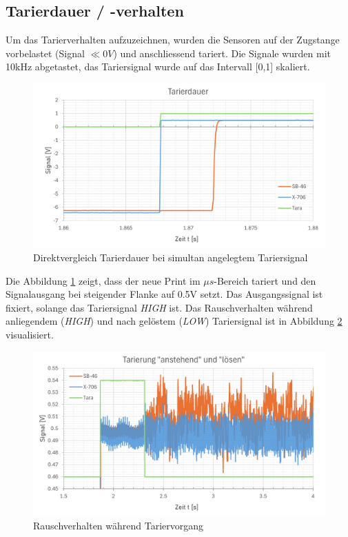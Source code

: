 \documentclass[12pt,a4paper]{article}
\begin{document}
	\subsection{Tarierdauer / -verhalten}
	Um das Tarierverhalten aufzuzeichnen, wurden die Sensoren auf der Zugstange vorbelastet (Signal $\ll 0V$) und anschliessend tariert. Die Signale wurden mit 10kHz abgetastet, das Tariersignal wurde auf das Intervall [0,1] skaliert.
	\begin{figure}[H]
		\centering
		\includegraphics[width=1\linewidth]{Imgs/Tarierdauer}
		\caption{Direktvergleich Tarierdauer bei simultan angelegtem Tariersignal}
		\label{fig:tarierdauer}
	\end{figure}\noindent
	Die Abbildung \ref{fig:tarierdauer} zeigt, dass der neue Print im  $\mu s$-Bereich tariert und den Signalausgang bei steigender Flanke auf 0.5V setzt. Das Ausgangssignal ist fixiert, solange das Tariersignal \textit{HIGH} ist. Das Rauschverhalten während anliegendem (\textit{HIGH}) und nach gelöstem (\textit{LOW}) Tariersignal ist in Abbildung \ref{fig:rauschentaravorgang} visualisiert.
	\begin{figure}[H]
		\centering
		\includegraphics[width=1\linewidth]{Imgs/Rauschen_taravorgang}
		\caption{Rauschverhalten während Tariervorgang}
		\label{fig:rauschentaravorgang}
	\end{figure}\noindent
\end{document}
